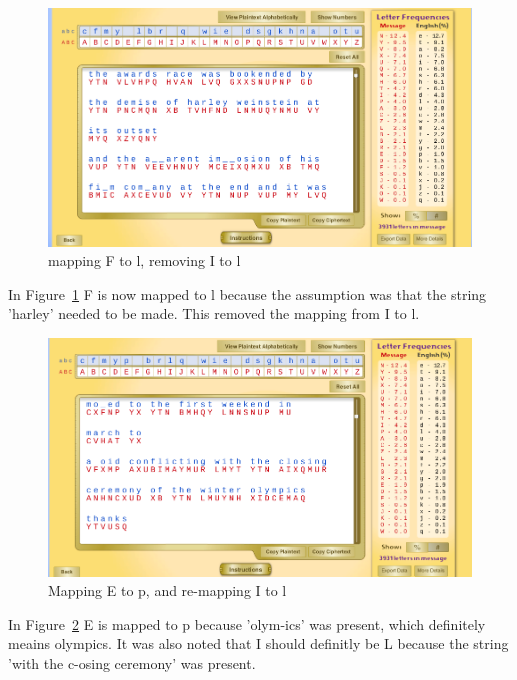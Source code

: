 \documentclass[12pt]{article}
\begin{document}
\begin{figure}[H]
    \begin{center}
        \includegraphics[scale=0.48]{c14.png}
    \end{center}{}
    \caption{mapping F to l, removing I to l}
    \label{fig:c14}
\end{figure}

In Figure~\ref{fig:c14} F is now mapped to l because the assumption was that the string 'harley' needed to be made. This removed the mapping from I to l.

\begin{figure}[H]
    \begin{center}
        \includegraphics[scale=0.48]{c15.png}
    \end{center}{}
    \caption{Mapping E to p, and re-mapping I to l}
    \label{fig:c15}
\end{figure}

In Figure~\ref{fig:c15} E is mapped to p because 'olym-ics' was present, which definitely meains olympics. It was also noted that I should definitly be L because the string 'with the c-osing ceremony' was present.
\end{document}
